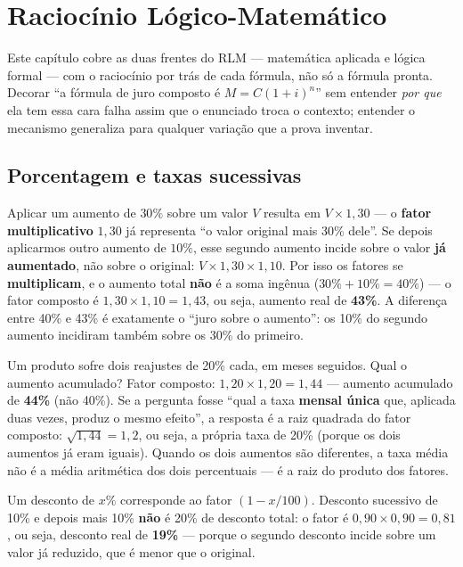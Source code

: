 \chapter{Raciocínio Lógico-Matemático}
\label{cap:rlm-teoria}

Este capítulo cobre as duas frentes do RLM --- matemática aplicada e lógica
formal --- com o raciocínio por trás de cada fórmula, não só a fórmula
pronta. Decorar “a fórmula de juro composto é $M=C(1+i)^n$” sem entender
\emph{por que} ela tem essa cara falha assim que o enunciado troca o
contexto; entender o mecanismo generaliza para qualquer variação que a
prova inventar.

\section{Porcentagem e taxas sucessivas}

\begin{conceito}
Aplicar um aumento de $30\%$ sobre um valor $V$ resulta em $V \times 1{,}30$
--- o \textbf{fator multiplicativo} $1{,}30$ já representa “o valor
original mais 30\% dele”. Se depois aplicarmos outro aumento de $10\%$,
esse segundo aumento incide sobre o valor \textbf{já aumentado}, não sobre
o original: $V \times 1{,}30 \times 1{,}10$. Por isso os fatores se
\textbf{multiplicam}, e o aumento total \textbf{não} é a soma ingênua
($30\%+10\%=40\%$) --- o fator composto é $1{,}30 \times 1{,}10 = 1{,}43$,
ou seja, aumento real de \textbf{43\%}. A diferença entre 40\% e 43\% é
exatamente o “juro sobre o aumento”: os 10\% do segundo aumento incidiram
também sobre os 30\% do primeiro.
\end{conceito}

\begin{exemplo}
Um produto sofre dois reajustes de 20\% cada, em meses seguidos. Qual o
aumento acumulado? Fator composto: $1{,}20 \times 1{,}20 = 1{,}44$ ---
aumento acumulado de \textbf{44\%} (não 40\%). Se a pergunta fosse “qual a
taxa \textbf{mensal única} que, aplicada duas vezes, produz o mesmo
efeito”, a resposta é a raiz quadrada do fator composto: $\sqrt{1{,}44} =
1{,}2$, ou seja, a própria taxa de 20\% (porque os dois aumentos já eram
iguais). Quando os dois aumentos são diferentes, a taxa média não é a
média aritmética dos dois percentuais --- é a raiz do produto dos fatores.
\end{exemplo}

\begin{cuidado}
Um desconto de $x\%$ corresponde ao fator $(1 - x/100)$. Desconto sucessivo
de 10\% e depois mais 10\% \textbf{não} é 20\% de desconto total: o fator é
$0{,}90 \times 0{,}90 = 0{,}81$, ou seja, desconto real de \textbf{19\%}
--- porque o segundo desconto incide sobre um valor já reduzido, que é
menor que o original.
\end{cuidado}

